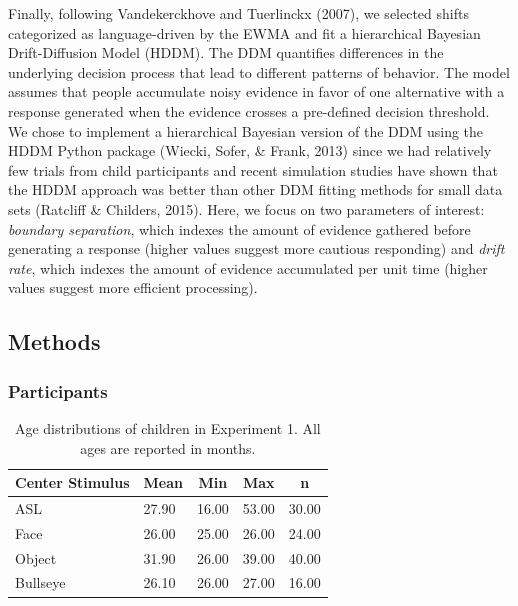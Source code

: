 \documentclass[english,floatsintext,man]{apa6}
\begin{document}
Finally, following Vandekerckhove and Tuerlinckx (2007), we selected
shifts categorized as language-driven by the EWMA and fit a hierarchical
Bayesian Drift-Diffusion Model (HDDM). The DDM quantifies differences in
the underlying decision process that lead to different patterns of
behavior. The model assumes that people accumulate noisy evidence in
favor of one alternative with a response generated when the evidence
crosses a pre-defined decision threshold. We chose to implement a
hierarchical Bayesian version of the DDM using the HDDM Python package
(Wiecki, Sofer, \& Frank, 2013) since we had relatively few trials from
child participants and recent simulation studies have shown that the
HDDM approach was better than other DDM fitting methods for small data
sets (Ratcliff \& Childers, 2015). Here, we focus on two parameters of
interest: \emph{boundary separation}, which indexes the amount of
evidence gathered before generating a response (higher values suggest
more cautious responding) and \emph{drift rate}, which indexes the
amount of evidence accumulated per unit time (higher values suggest more
efficient processing).

\hypertarget{methods}{%
\subsection{Methods}\label{methods}}

\hypertarget{participants}{%
\subsubsection{Participants}\label{participants}}

\begin{table}[tbp]
\begin{center}
\begin{threeparttable}
\caption{\label{tab:trio make participants table}Age distributions of children in Experiment 1. All ages are reported in months.}
\begin{tabular}{lllll}
\toprule
Center Stimulus & \multicolumn{1}{c}{Mean} & \multicolumn{1}{c}{Min} & \multicolumn{1}{c}{Max} & \multicolumn{1}{c}{n}\\
\midrule
ASL & 27.90 & 16.00 & 53.00 & 30.00\\
Face & 26.00 & 25.00 & 26.00 & 24.00\\
Object & 31.90 & 26.00 & 39.00 & 40.00\\
Bullseye & 26.10 & 26.00 & 27.00 & 16.00\\
\bottomrule
\end{tabular}
\end{threeparttable}
\end{center}
\end{table}
\end{document}
